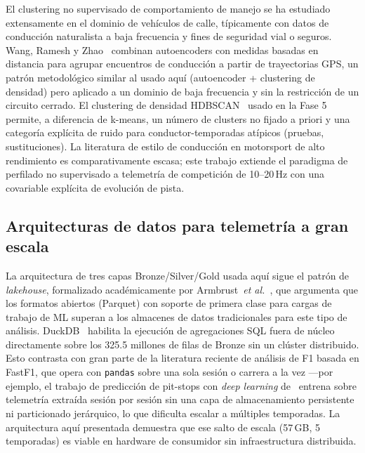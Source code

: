 \documentclass[conference]{IEEEtran}
\begin{document}
El clustering no supervisado de comportamiento de manejo se ha estudiado
extensamente en el dominio de vehículos de calle, típicamente con datos de
conducción naturalista a baja frecuencia y fines de seguridad vial o
seguros. Wang, Ramesh y Zhao~\cite{wang2018clustering} combinan
autoencoders con medidas basadas en distancia para agrupar encuentros de
conducción a partir de trayectorias GPS, un patrón metodológico similar al
usado aquí (autoencoder + clustering de densidad) pero aplicado a un dominio
de baja frecuencia y sin la restricción de un circuito cerrado. El
clustering de densidad HDBSCAN~\cite{campello2013,mcinnes2017} usado en la
Fase 5 permite, a diferencia de k-means, un número de clusters no fijado a
priori y una categoría explícita de ruido para conductor-temporadas
atípicos (pruebas, sustituciones). La literatura de estilo de conducción en
motorsport de alto rendimiento es comparativamente escasa; este trabajo
extiende el paradigma de perfilado no supervisado a telemetría de
competición de 10–20\,Hz con una covariable explícita de evolución de pista.

\subsection{Arquitecturas de datos para telemetría a gran escala}

La arquitectura de tres capas Bronze/Silver/Gold usada aquí sigue el patrón
de \emph{lakehouse}, formalizado académicamente por
Armbrust~\emph{et al.}~\cite{armbrust2021}, que argumenta que los formatos
abiertos (Parquet) con soporte de primera clase para cargas de trabajo de ML
superan a los almacenes de datos tradicionales para este tipo de análisis.
DuckDB~\cite{raasveldt2019} habilita la ejecución de agregaciones SQL fuera
de núcleo directamente sobre los 325.5 millones de filas de Bronze sin un
clúster distribuido. Esto contrasta con gran parte de la literatura reciente
de análisis de F1 basada en FastF1, que opera con \texttt{pandas} sobre una
sola sesión o carrera a la vez —por ejemplo, el trabajo de predicción de
pit-stops con \emph{deep learning} de~\cite{frontiers2025pitstop} entrena
sobre telemetría extraída sesión por sesión sin una capa de almacenamiento
persistente ni particionado jerárquico, lo que dificulta escalar a múltiples
temporadas. La arquitectura aquí presentada demuestra que ese salto de
escala (57\,GB, 5 temporadas) es viable en hardware de consumidor sin
infraestructura distribuida.
\end{document}
